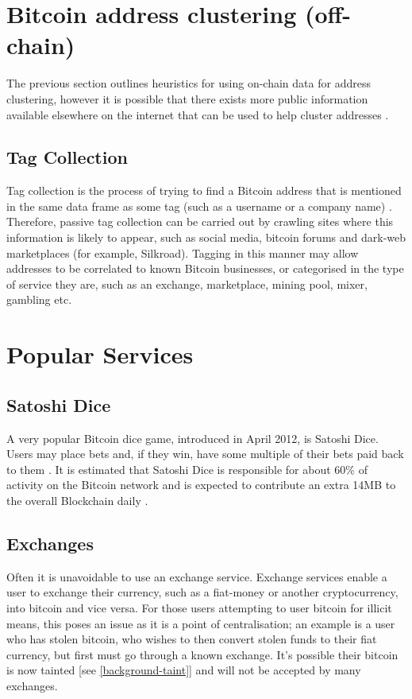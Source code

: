 \section{Bitcoin address clustering (off-chain)}
The previous section outlines heuristics for using on-chain data for address clustering, however it is possible that there exists more public information available elsewhere on the internet that can be used to help cluster addresses \cite{RefWorks:doc:5c3ef27be4b03c7dd82ce4e6}. 

\subsection{Tag Collection}\label{background-tag-collection}
Tag collection is the process of trying to find a Bitcoin address that is mentioned in the same data frame as some tag (such as a username or a company name) \cite{RefWorks:doc:5c3ef27be4b03c7dd82ce4e6}. Therefore, passive tag collection can be carried out by crawling sites where this information is likely to appear, such as social media, bitcoin forums and dark-web marketplaces (for example, Silkroad). Tagging in this manner may allow addresses to be correlated to known Bitcoin businesses, or categorised in the type of service they are, such as an exchange, marketplace, mining pool, mixer, gambling etc. 


\section{Popular Services}
\subsection{Satoshi Dice}
A very popular Bitcoin dice game, introduced in April 2012, is Satoshi Dice. Users may place bets and, if they win, have some multiple of their bets paid back to them \cite{Refworks:doc:5c3de7e3e4b0ea6196452d80}. It is estimated that Satoshi Dice is responsible for about 60\% of activity on the Bitcoin network and is expected to contribute an extra 14MB to the overall Blockchain daily \cite{Refworks:doc:5c3de7e3e4b0ea6196452d80}. 


\subsection{Exchanges}
Often it is unavoidable to use an exchange service. Exchange services enable a user to exchange their currency, such as a \gls{fiat-money} or another cryptocurrency, into bitcoin and vice versa. For those users attempting to user bitcoin for illicit means, this poses an issue as it is a point of centralisation; an example is a user who has stolen bitcoin, who wishes to then convert stolen funds to their fiat currency, but first must go through a known exchange. It's possible their bitcoin is now tainted [see \ref{background-taint}] and will not be accepted by many exchanges. 

